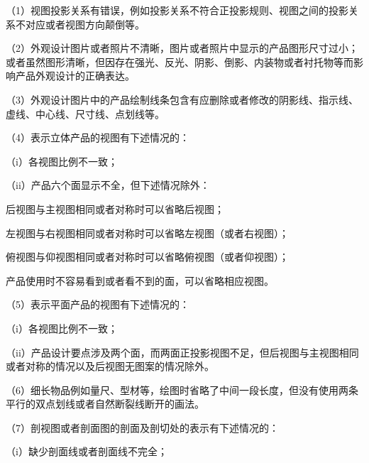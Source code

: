 {\setlength{\parindent}{17.1bp}（1）视图投影关系有错误，例如投影关系不符合正投影规则、视图之间的投影关系不对应或者视图方向颠倒等。\par}

{\setlength{\parindent}{17.1bp}（2）外观设计图片或者照片不清晰，图片或者照片中显示的产品图形尺寸过小；或者虽然图形清晰，但因存在强光、反光、阴影、倒影、内装物或者衬托物等而影响产品外观设计的正确表达。\par}

{\setlength{\parindent}{17.1bp}（3）外观设计图片中的产品绘制线条包含有应删除或者修改的阴影线、指示线、虚线、中心线、尺寸线、点划线等。\par}

{\setlength{\parindent}{17.1bp}（4）表示立体产品的视图有下述情况的：\par}

{\setlength{\parindent}{17.1bp}（i）各视图比例不一致；\par}

{\setlength{\parindent}{17.1bp}（ii）产品六个面显示不全，但下述情况除外：\par}

后视图与主视图相同或者对称时可以省略后视图；

左视图与右视图相同或者对称时可以省略左视图（或者右视图）；

俯视图与仰视图相同或者对称时可以省略俯视图（或者仰视图）；

产品使用时不容易看到或者看不到的面，可以省略相应视图。

{\setlength{\parindent}{17.1bp}（5）表示平面产品的视图有下述情况的：\par}

{\setlength{\parindent}{17.1bp}（i）各视图比例不一致；\par}

{\setlength{\parindent}{17.1bp}（ii）产品设计要点涉及两个面，而两面正投影视图不足，但后视图与主视图相同或者对称的情况以及后视图无图案的情况除外。\par}

{\setlength{\parindent}{17.1bp}（6）细长物品例如量尺、型材等，绘图时省略了中间一段长度，但没有使用两条平行的双点划线或者自然断裂线断开的画法。\par}

{\setlength{\parindent}{17.1bp}（7）剖视图或者剖面图的剖面及剖切处的表示有下述情况的：\par}

{\setlength{\parindent}{17.1bp}（i）缺少剖面线或者剖面线不完全；\par}

